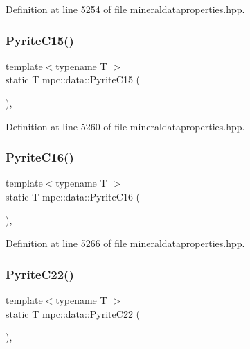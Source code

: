 Definition at line 5254 of file mineraldataproperties.\+hpp.

\mbox{\label{namespacempc_1_1data_aaa65841ee18aacf1f2129550c8477a98}} 
\subsubsection{\texorpdfstring{Pyrite\+C15()}{PyriteC15()}}
{\footnotesize\ttfamily template$<$typename T $>$ \\
static T mpc\+::data\+::\+Pyrite\+C15 (\begin{DoxyParamCaption}{ }\end{DoxyParamCaption})\hspace{0.3cm}{\ttfamily [inline]}, {\ttfamily [static]}}



Definition at line 5260 of file mineraldataproperties.\+hpp.

\mbox{\label{namespacempc_1_1data_aadc7907a02ccd1335349064d3513770d}} 
\subsubsection{\texorpdfstring{Pyrite\+C16()}{PyriteC16()}}
{\footnotesize\ttfamily template$<$typename T $>$ \\
static T mpc\+::data\+::\+Pyrite\+C16 (\begin{DoxyParamCaption}{ }\end{DoxyParamCaption})\hspace{0.3cm}{\ttfamily [inline]}, {\ttfamily [static]}}



Definition at line 5266 of file mineraldataproperties.\+hpp.

\mbox{\label{namespacempc_1_1data_aafae2f7b8f2d79d9b2c0a5bc7d8cd87c}} 
\subsubsection{\texorpdfstring{Pyrite\+C22()}{PyriteC22()}}
{\footnotesize\ttfamily template$<$typename T $>$ \\
static T mpc\+::data\+::\+Pyrite\+C22 (\begin{DoxyParamCaption}{ }\end{DoxyParamCaption})\hspace{0.3cm}{\ttfamily [inline]}, {\ttfamily [static]}}



